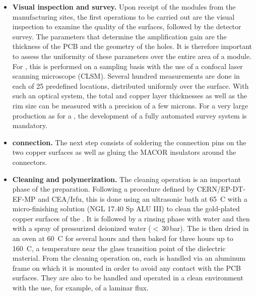 \begin{itemize}
\item {\bf Visual inspection and survey.} Upon receipt of the  modules from the manufacturing sites, the first operations to be carried out are the visual inspection to examine the quality of the  surfaces, %
followed by the detector survey. The parameters that determine the  amplification gain are the thickness of the PCB and the geometry of the holes. It is therefore important to assess the uniformity of these parameters over the entire area of a  module. For  , this is performed on a sampling basis with the use of a confocal laser scanning microscope (CLSM). Several hundred measurements are done in each of \num{25} predefined locations, distributed uniformly over the  surface. With such an optical system, the total  and copper layer thicknesses as well as the rim size can be measured with a precision of a few microns. For a very large production as for a , the development of a fully automated survey system is mandatory. 

\item {\bf {} connection.} The next step consists of soldering the  connection pins on the two  copper surfaces as well as gluing the MACOR insulators around the connectors.

\item {\bf Cleaning and polymerization.} The cleaning operation is an important phase of the  preparation. Following a procedure defined by CERN/EP-DT-EF-MP and CEA/Irfu,
 this is done using an ultrasonic bath at \SI{65}{C} with a micro-finishing solution (NGL 17.40 Sp ALU III) to clean the gold-plated copper surfaces of the . It is followed by a rinsing phase with water and then with a spray of pressurized deionized water %
 ($<$\,30\,bar). The  is then dried in an oven 
at \SI{60}{C}  for several hours and then baked for three hours up to \SI{160}{C}, %
a temperature near the glass transition point of the dielectric material. From the cleaning operation on, each  is handled via an aluminum frame on which it is mounted in order to avoid any contact with the PCB surfaces. They are also to be %
handled and operated in a clean environment with the use, for example, of a laminar flux.  


\end{itemize}

